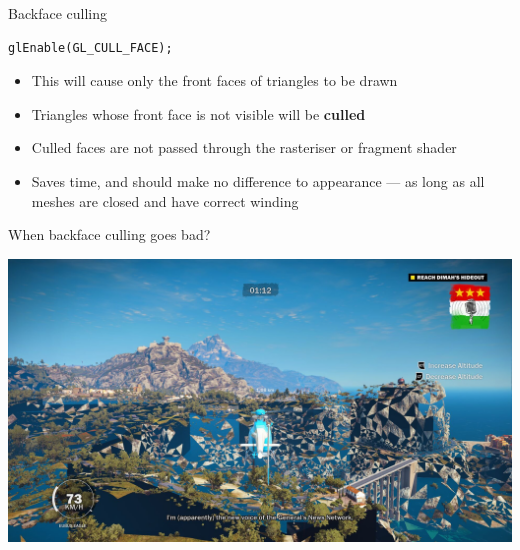 \begin{frame}[fragile]{Backface culling}
	\pause
	\begin{lstlisting}
glEnable(GL_CULL_FACE);
	\end{lstlisting}
	\begin{itemize}
		\pause\item This will cause only the front faces of triangles to be drawn
		\pause\item Triangles whose front face is not visible will be \textbf{culled}
		\pause\item Culled faces are not passed through the rasteriser or fragment shader
		\pause\item Saves time, and should make no difference to appearance ---
			as long as all meshes are closed and have correct winding
	\end{itemize}
\end{frame}

\begin{frame}[fragile]{When backface culling goes bad?}
	\begin{center}
		\includegraphics[width=\textwidth]{missing_triangles}
	\end{center}
\end{frame}

